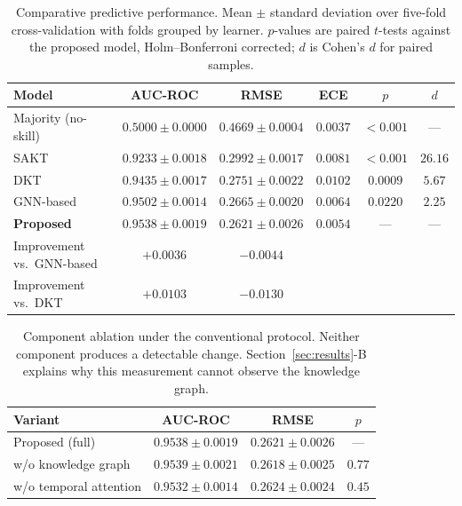\documentclass[conference]{IEEEtran}
\begin{document}
\begin{table}[t]
\centering
\caption{Comparative predictive performance. Mean $\pm$ standard deviation over five-fold
cross-validation with folds grouped by learner. $p$-values are paired $t$-tests against
the proposed model, Holm--Bonferroni corrected; $d$ is Cohen's $d$ for paired samples.}
\label{tab:accuracy}
\begin{tabular}{lccccc}
\toprule
Model & AUC-ROC & RMSE & ECE & $p$ & $d$ \\
\midrule
Majority (no-skill)         & $0.5000 \pm 0.0000$ & $0.4669 \pm 0.0004$ & $0.0037$ & $<0.001$ & --- \\
SAKT \cite{pandey2019sakt}  & $0.9233 \pm 0.0018$ & $0.2992 \pm 0.0017$ & $0.0081$ & $<0.001$ & $26.16$ \\
DKT \cite{piech2015dkt}     & $0.9435 \pm 0.0017$ & $0.2751 \pm 0.0022$ & $0.0102$ & $0.0009$ & $5.67$ \\
GNN-based                   & $0.9502 \pm 0.0014$ & $0.2665 \pm 0.0020$ & $0.0064$ & $0.0220$ & $2.25$ \\
\textbf{Proposed}           & $\mathbf{0.9538 \pm 0.0019}$ & $\mathbf{0.2621 \pm 0.0026}$ & $\mathbf{0.0054}$ & --- & --- \\
\midrule
Improvement vs.\ GNN-based  & $+0.0036$ & $-0.0044$ & & & \\
Improvement vs.\ DKT        & $+0.0103$ & $-0.0130$ & & & \\
\bottomrule
\end{tabular}
\end{table}

\begin{table}[t]
\centering
\caption{Component ablation under the conventional protocol. Neither component produces
a detectable change. Section~\ref{sec:results}-B explains why this measurement cannot
observe the knowledge graph.}
\label{tab:ablation}
\begin{tabular}{lccc}
\toprule
Variant & AUC-ROC & RMSE & $p$ \\
\midrule
Proposed (full)              & $0.9538 \pm 0.0019$ & $0.2621 \pm 0.0026$ & --- \\
\quad w/o knowledge graph    & $0.9539 \pm 0.0021$ & $0.2618 \pm 0.0025$ & $0.77$ \\
\quad w/o temporal attention & $0.9532 \pm 0.0014$ & $0.2624 \pm 0.0024$ & $0.45$ \\
\bottomrule
\end{tabular}
\end{table}
\end{document}
